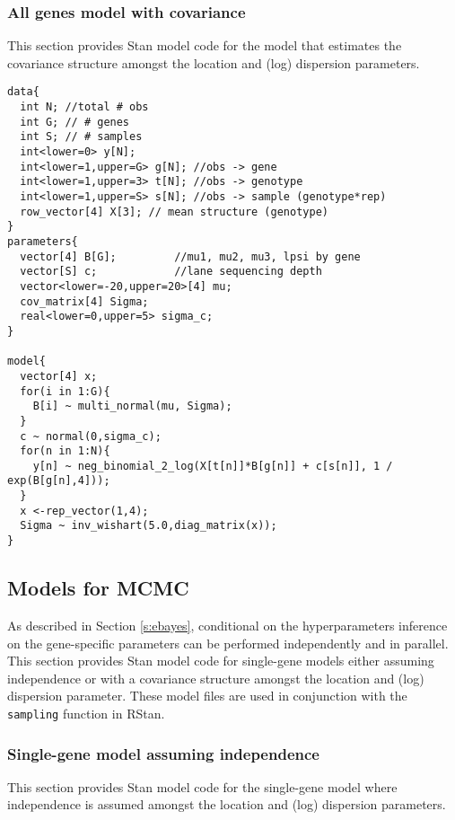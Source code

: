 \subsubsection{All genes model with covariance}
\label{s:all_genes_model_with_covariance}

This section provides Stan model code for the model that estimates the covariance structure amongst the location and (log) dispersion parameters. 

\begin{verbatim}
data{
  int N; //total # obs
  int G; // # genes
  int S; // # samples
  int<lower=0> y[N];
  int<lower=1,upper=G> g[N]; //obs -> gene
  int<lower=1,upper=3> t[N]; //obs -> genotype
  int<lower=1,upper=S> s[N]; //obs -> sample (genotype*rep)
  row_vector[4] X[3]; // mean structure (genotype)
}
parameters{
  vector[4] B[G];         //mu1, mu2, mu3, lpsi by gene
  vector[S] c;            //lane sequencing depth
  vector<lower=-20,upper=20>[4] mu;
  cov_matrix[4] Sigma;
  real<lower=0,upper=5> sigma_c;
}

model{
  vector[4] x;
  for(i in 1:G){
    B[i] ~ multi_normal(mu, Sigma);
  }
  c ~ normal(0,sigma_c);
  for(n in 1:N){
    y[n] ~ neg_binomial_2_log(X[t[n]]*B[g[n]] + c[s[n]], 1 / exp(B[g[n],4]));
  }
  x <-rep_vector(1,4);
  Sigma ~ inv_wishart(5.0,diag_matrix(x));
}
\end{verbatim}

\subsection{Models for MCMC}

As described in Section \ref{s:ebayes}, conditional on the hyperparameters inference on the gene-specific parameters can be performed independently and in parallel. This section provides Stan model code for single-gene models either assuming independence or with a covariance structure amongst the location and (log) dispersion parameter. These model files are used in conjunction with the {\tt sampling} function in RStan. 

\subsubsection{Single-gene model assuming independence}
\label{s:single_gene_model}

This section provides Stan model code for the single-gene model where independence is assumed amongst the location and (log) dispersion parameters.

